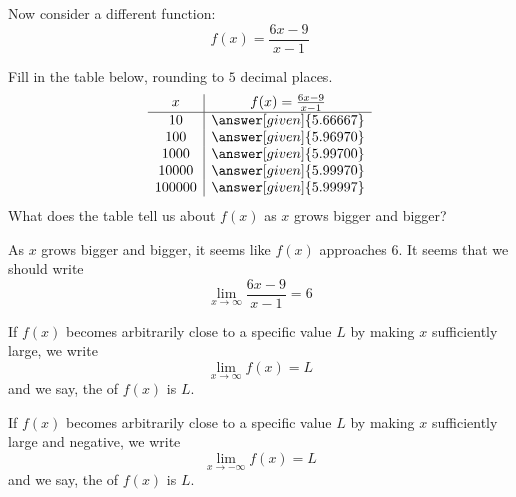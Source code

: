 \documentclass{ximera}
\begin{document}
\begin{example}
  Now consider a different function:
  \[
  f(x) = \frac{6x-9}{x-1}
  \]
  \begin{image}
  \end{image}
  Fill in the table below, rounding to $5$ decimal places.
  \[
  \begin{array}{c|c}
    x      & f(x)=\frac{6x-9}{x-1} \\ \hline
    10     & \answer[given]{5.66667}\\
    100    & \answer[given]{5.96970}\\
    1000   & \answer[given]{5.99700}\\
    10000  & \answer[given]{5.99970}\\
    100000 & \answer[given]{5.99997}\\
  \end{array}
  \]
  What does the table tell us about $f(x)$ as $x$ grows bigger and bigger?
  \begin{explanation}
    As $x$ grows bigger and bigger, it seems like $f(x)$ approaches $6$.
    It seems that we should write
    \[
    \lim_{x\to \infty}\frac{6x-9}{x-1}=6 
    \]
  \end{explanation}
\end{example}

\begin{definition}\label{def:limitAtInfty}
If $f(x)$ becomes arbitrarily close to a specific value $L$ by making
$x$ sufficiently large, we write
\[
\lim_{x\to \infty} f(x) = L
\]
and we say, the  of $f(x)$ is $L$.  

If $f(x)$ becomes arbitrarily close to a specific value $L$ by making
$x$ sufficiently large and negative, we write
\[
\lim_{x\to -\infty} f(x) = L
\]
and we say, the  of $f(x)$ is $L$.  
\end{definition}
\end{document}
